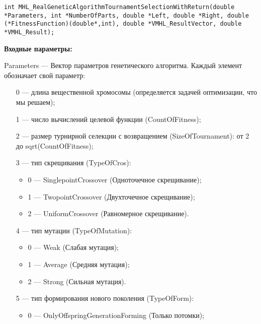 \documentclass[a4paper,12pt]{article}
\begin{document}
\begin{lstlisting}[label=code_syntax_MHL_RealGeneticAlgorithmTournamentSelectionWithReturn,caption=Синтаксис]
int MHL_RealGeneticAlgorithmTournamentSelectionWithReturn(double *Parameters, int *NumberOfParts, double *Left, double *Right, double (*FitnessFunction)(double*,int), double *VMHL_ResultVector, double *VMHL_Result);
\end{lstlisting}

\textbf{Входные параметры:}
 
Parameters --- Вектор параметров генетического алгоритма. Каждый элемент обозначает свой параметр:
 
 \begin{itemize}
 \item   [0] --- длина вещественной хромосомы (определяется задачей оптимизации, что мы решаем);
  \item   [1] --- число вычислений целевой функции (CountOfFitness);
   \item [2] --- размер турнирной селекции  с возвращением  (SizeOfTournament): от 2 до sqrt(CountOfFitness);
 
 \item [3] --- тип скрещивания (TypeOfCros):
  \begin{itemize}
       \item 0 --- SinglepointCrossover (Одноточечное скрещивание);
 
       \item 1 --- TwopointCrossover (Двухточечное скрещивание);
 
       \item 2 --- UniformCrossover (Равномерное скрещивание).
	    \end{itemize}
 
 \item [4] --- тип мутации (TypeOfMutation):
  \begin{itemize}
       \item 0 --- Weak (Слабая мутация);
 
       \item 1 --- Average (Средняя мутация);
 
       \item 2 --- Strong (Сильная мутация).
	    \end{itemize}
 
 \item [5] --- тип формирования нового поколения (TypeOfForm):
  \begin{itemize}
       \item 0 --- OnlyOffspringGenerationForming (Только потомки);
 

\end{itemize}
\end{itemize}
\end{document}
